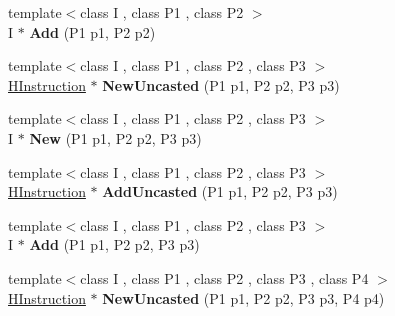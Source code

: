 \begin{DoxyCompactItemize}
\item 
{\footnotesize template$<$class I , class P1 , class P2 $>$ }\\I $\ast$ {\bfseries Add} (P1 p1, P2 p2)\hypertarget{classv8_1_1internal_1_1_h_graph_builder_a362f0202012ace8038a9c1cfe239ef12}{}\label{classv8_1_1internal_1_1_h_graph_builder_a362f0202012ace8038a9c1cfe239ef12}

\item 
{\footnotesize template$<$class I , class P1 , class P2 , class P3 $>$ }\\\hyperlink{classv8_1_1internal_1_1_h_instruction}{H\+Instruction} $\ast$ {\bfseries New\+Uncasted} (P1 p1, P2 p2, P3 p3)\hypertarget{classv8_1_1internal_1_1_h_graph_builder_a3881f206014cc74df55704065c7b27c1}{}\label{classv8_1_1internal_1_1_h_graph_builder_a3881f206014cc74df55704065c7b27c1}

\item 
{\footnotesize template$<$class I , class P1 , class P2 , class P3 $>$ }\\I $\ast$ {\bfseries New} (P1 p1, P2 p2, P3 p3)\hypertarget{classv8_1_1internal_1_1_h_graph_builder_ada350fd78c23c1fa3716ddd4ec312d4e}{}\label{classv8_1_1internal_1_1_h_graph_builder_ada350fd78c23c1fa3716ddd4ec312d4e}

\item 
{\footnotesize template$<$class I , class P1 , class P2 , class P3 $>$ }\\\hyperlink{classv8_1_1internal_1_1_h_instruction}{H\+Instruction} $\ast$ {\bfseries Add\+Uncasted} (P1 p1, P2 p2, P3 p3)\hypertarget{classv8_1_1internal_1_1_h_graph_builder_aff2d81ad06ed7719007cfc326b884d72}{}\label{classv8_1_1internal_1_1_h_graph_builder_aff2d81ad06ed7719007cfc326b884d72}

\item 
{\footnotesize template$<$class I , class P1 , class P2 , class P3 $>$ }\\I $\ast$ {\bfseries Add} (P1 p1, P2 p2, P3 p3)\hypertarget{classv8_1_1internal_1_1_h_graph_builder_abd15e7596368f13569e6c3b050b7f884}{}\label{classv8_1_1internal_1_1_h_graph_builder_abd15e7596368f13569e6c3b050b7f884}

\item 
{\footnotesize template$<$class I , class P1 , class P2 , class P3 , class P4 $>$ }\\\hyperlink{classv8_1_1internal_1_1_h_instruction}{H\+Instruction} $\ast$ {\bfseries New\+Uncasted} (P1 p1, P2 p2, P3 p3, P4 p4)\hypertarget{classv8_1_1internal_1_1_h_graph_builder_a288d97c75872e441ed1084e05b203410}{}\label{classv8_1_1internal_1_1_h_graph_builder_a288d97c75872e441ed1084e05b203410}


\end{DoxyCompactItemize}
